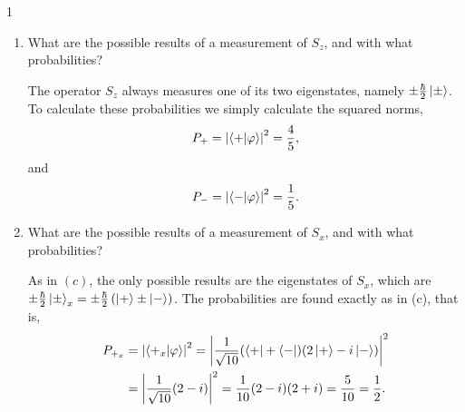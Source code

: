 \documentclass[11pt]{article}
\begin{document}
\begin{problem}{1}
\begin{enumerate}[label=(\alph*)]
\begin{answer}
            Therefore,
            \begin{equation}
            \label{eq:8}
            \ket{\varphi} \doteq_y \frac{1}{\sqrt{10}} \begin{pmatrix}
1 \\
3
 \end{pmatrix}.
            \end{equation}
          \end{answer}
    \item What are the possible results of a measurement of \( S_z \), and with what probabilities?
          \begin{answer}
            The operator \( S_z \) always measures one of its two eigenstates, namely \( \pm \frac{\hbar}{2} \ket{\pm} \).
            To calculate these probabilities we simply calculate the squared norms,
            \begin{equation}
            \label{eq:9}
            P_+ = \left| \ip{+}{\varphi} \right|^2 = \frac{4}{5},
          \end{equation}
          and
          \begin{equation}
          \label{eq:10}
          P_- = \left| \ip{-}{\varphi} \right|^2 = \frac{1}{5}.
          \end{equation}
          \end{answer}
    \item What are the possible results of a measurement of \( S_x \), and with what probabilities?
          \begin{answer}
            As in \( (c) \), the only possible results are the eigenstates of \( S_x \), which are \( \pm \frac{\hbar}{2} \ket{\pm}_x = \pm \frac{\hbar}{2} \left( \ket{+} \pm \ket{-} \right)\).
            The probabilities are found exactly as in (c), that is,
            \begin{equation}
              \begin{aligned}
            \label{eq:11}
                P_{+_x} &= \left| \ip{+_x}{\varphi} \right|^2 = \left| \frac{1}{\sqrt{10}}(\bra{+} + \bra{-})(2\ket{+} - i\ket{-}) \right|^2 \\
                &= \left| \frac{1}{\sqrt{10}} (2 - i) \right|^2 = \frac{1}{10} (2-i)(2+i) = \frac{5}{10} = \frac{1}{2}.
                \end{aligned}
            \end{equation}


\end{answer}
\end{enumerate}
\end{problem}
\end{document}
